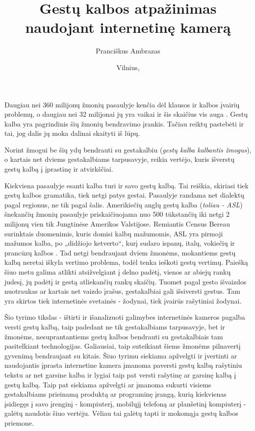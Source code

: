 \documentclass{VUMIFInfKursinis}
\title{Gestų kalbos atpažinimas naudojant internetinę kamerą}
\author{Pranciškus Ambrazas}
\date{Vilnius, \the\year}
\begin{document}
\maketitle

\tableofcontents


Daugiau nei 360 milijonų žmonių pasaulyje kenčia dėl klausos ir kalbos įvairių problemų, o daugiau nei 32 milijonai jų yra vaikai ir šis skaičius vis auga \cite{WhoInt}. Gestų kalba yra pagrindinis šių žmonių bendravimo įrankis. Tačiau reiktų pastebėti ir tai, jog dalis jų moka dalinai skaityti iš lūpų. 

Norint žmogui be šių ydų bendrauti su gestakalbiu (\textit{gestų kalba kalbantis žmogus}), o kartais net dviems gestakalbiams tarpusavyje, reikia vertėjo, kuris išverstų gestų kalbą į įprastinę ir atvirkščiai.

Kiekviena pasaulyje esanti kalba turi ir savo gestų kalbą. Tai reiškia, skiriasi tiek gestų kalbos gramatika, tiek netgi patys gestai. Pasaulyje randama net dialektų pagal regionus, ne tik pagal šalis. Amerikiečių anglų gestų kalba (\textit{toliau - ASL}) šnekančių žmonių pasaulyje priskaičiuojama nuo 500 tūkstančių iki netgi 2 milijonų vien tik Jungtinėse Amerikos Valstijose. Remiantis Census Bereau surinktais duomenimis, kuris domisi kalbų mažumomis, ASL yra pirmoji mažumos kalba, po „didžiojo ketverto“, kurį sudaro ispanų, italų, vokiečių ir prancūzų kalbos \cite{GUL}. Tad netgi bendraujant dviem žmonėms, mokantiems gestų kalbą neretai iškyla vertimo problema, todėl tenka ieškoti gestų vertimų. Paiešką šiuo metu galima atlikti atsižvelgiant į delno padėtį, vienos ar abiejų rankų judesį, jų padėtį ir gestą atliekančių rankų skaičių. Tuomet pagal gesto išvaizdos nuotraukas ar kartais net vaizdo įrašus, gestakalbiai gali išsiversti gestus. Tam yra skirtos tiek internetinės svetainės - žodynai, tiek įvairūs rašytiniai žodynai.



Šio tyrimo tikslas - ištirti ir išanalizuoti galimybes internetinės kameros pagalba versti gestų kalbą, taip padedant ne tik gestakalbiams tarpusavyje, bet ir žmonėms, nesuprantantiems gestų kalbos bendrauti su gestakalbiais tam pasitelkiant technologijas. Galiausiai, taip suteikiant šiems žmonėms pilnavertį gyvenimą bendraujant su kitais. Šiuo tyrimu siekiama apžvelgti ir įvertinti ar naudojantis įprasta internetine kamera įmanoma paversti gestų kalbą rašytiniu tekstu ar net garsine kalba ir lygiai taip pat versti rašytinę ar garsinę kalbą į gestų kalbą. Taip pat siekiama apžvelgti ar įmanoma sukurti visiems gestakalbiams prieinamą produktą ar programinę įrangą, kurią kiekvienas įsidiegęs į savo įrenginį - kompiuterį, mobilųjį telefoną ar planšetinį kompiuterį - galėtų naudotis šiuo vertėju. Vėliau tai galėtų tapti ir mokomąja gestų kalbos priemone. 
\end{document}
